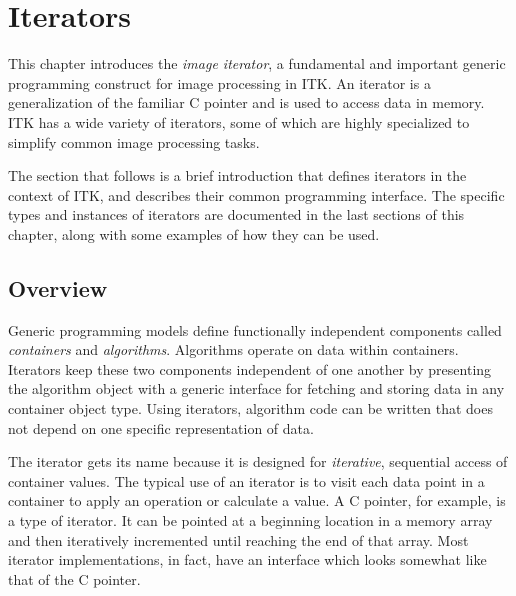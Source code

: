 \chapter{Iterators}





This chapter introduces the \emph{image iterator}, a fundamental and important
generic programming construct for image processing in ITK.  An iterator is a
generalization of the familiar C pointer and is used to access data in memory.  ITK
has a wide variety of iterators, some of which are highly specialized to
simplify common image processing tasks.

The section that follows is a brief introduction that defines iterators in the
context of ITK, and describes their common programming
interface.  The specific types and instances of iterators are documented in the
last sections of this chapter, along with some examples of how they can be
used.

\section{Overview}
\label{sec:IteratorsIntroduction}
Generic programming models define functionally independent components called
\emph{containers} and \emph{algorithms}.  Algorithms operate on data
within containers.  Iterators keep these two components independent of one
another by presenting the algorithm object with a generic interface for
fetching and storing data in any container object type.  Using iterators,
algorithm code can be written that does not depend on one specific
representation of data.

The iterator gets its name because it is designed for \emph{iterative},
sequential access of container values.  The typical use of an iterator is to
visit each data point in a container to apply an operation or calculate a
value.  A C pointer, for example, is a type of iterator.  It can be pointed at
a beginning location in a memory array and then iteratively incremented until
reaching the end of that array.  Most iterator implementations, in fact, have
an interface which looks somewhat like that of the C pointer.

